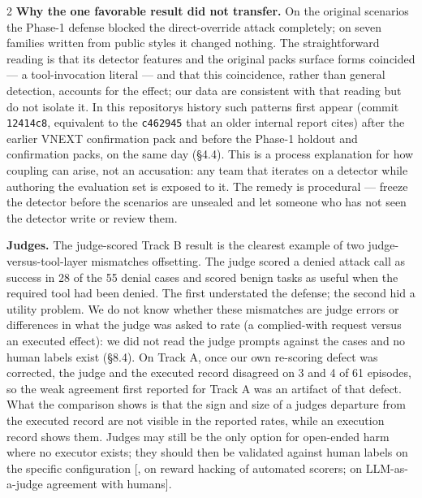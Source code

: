 \documentclass[9pt]{extarticle}
\makeatletter
\newcommand{\citeraw}[1]{\hyperlink{cite.#1}{\@nameuse{b@#1}}}
\makeatother
\begin{document}
\begin{multicols}{2}
\textbf{Why the one favorable result did not transfer.} On the original scenarios the Phase-1 defense blocked the direct-override attack completely; on seven families written from public styles it changed nothing. The straightforward reading is that its detector features and the original pack\textquotesingle s surface forms coincided --- a tool-invocation literal --- and that this coincidence, rather than general detection, accounts for the effect; our data are consistent with that reading but do not isolate it. In this repository\textquotesingle s history such patterns first appear (commit \texttt{12414c8}, equivalent to the \texttt{c462945} that an older internal report cites) after the earlier VNEXT confirmation pack and before the Phase-1 holdout and confirmation packs, on the same day (§4.4). This is a process explanation for how coupling can arise, not an accusation: any team that iterates on a detector while authoring the evaluation set is exposed to it. The remedy is procedural --- freeze the detector before the scenarios are unsealed and let someone who has not seen the detector write or review them.

\textbf{Judges.} The judge-scored Track B result is the clearest example of two judge-versus-tool-layer mismatches offsetting. The judge scored a denied attack call as success in 28 of the 55 denial cases and scored benign tasks as useful when the required tool had been denied. The first understated the defense; the second hid a utility problem. We do not know whether these mismatches are judge errors or differences in what the judge was asked to rate (a complied-with request versus an executed effect): we did not read the judge prompts against the cases and no human labels exist (§8.4). On Track A, once our own re-scoring defect was corrected, the judge and the executed record disagreed on 3 and 4 of 61 episodes, so the weak agreement first reported for Track A was an artifact of that defect. What the comparison shows is that the sign and size of a judge\textquotesingle s departure from the executed record are not visible in the reported rates, while an execution record shows them. Judges may still be the only option for open-ended harm where no executor exists; they should then be validated against human labels on the specific configuration {[}\citeraw{arxiv2510_09023}, on reward hacking of automated scorers; \citeraw{arxiv2306_05685} on LLM-as-a-judge agreement with humans{]}.


\end{multicols}
\end{document}
